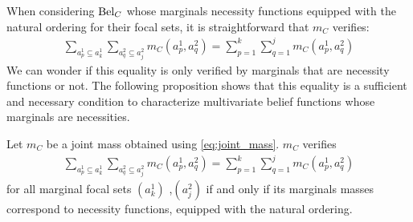 When considering $\mathrm{Bel}_C$ whose marginals necessity functions equipped with the natural ordering for their focal sets, it is straightforward that $m_C$ verifies:
\begin{align*}
    \sum_{a^1_p\subseteq a_k^1}\sum_{a^2_q\subseteq a_j^2}m_C(a^1_p, a^2_q) = \sum_{p=1}^k\sum_{q=1}^j m_C(a^1_p, a^2_q)
\end{align*}
We can wonder if this equality is only verified by marginals that are necessity functions or not. The following proposition shows that this equality is a sufficient and necessary condition to characterize multivariate belief functions whose marginals are necessities. 
\begin{proposition}
    Let $m_C$ be a joint mass obtained using \eqref{eq:joint_mass}. $m_C$ verifies
    \begin{align*}
        \sum_{a^1_p\subseteq a_k^1}\sum_{a^2_q\subseteq a_j^2}m_C(a^1_p, a^2_q) = \sum_{p=1}^k\sum_{q=1}^j m_C(a^1_p, a^2_q)
    \end{align*}
    for all marginal focal sets $(a^1_k)$ ,$(a^2_j)$ if and only if its marginals masses correspond to necessity functions, equipped with the natural ordering.
\end{proposition}
